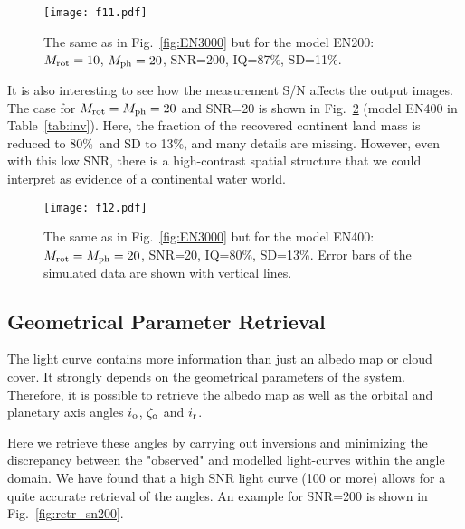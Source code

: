 \documentclass{emulateapj}
\begin{document}
\begin{figure}
\centering
\texttt{[image: f11.pdf]}
\caption{The same as in Fig.~\ref{fig:EN3000} but for the model EN200: 
$M_{\rm rot}=10$, $M_{\rm ph}=20$, SNR=200, IQ=87\%, SD=11\%.}
\label{fig:EN200}
\end{figure}

It is also interesting to see how the measurement S/N affects the output images.
The case for $M_{\rm rot}=M_{\rm ph}=20$ and SNR=20 is shown in Fig.~\ref{fig:EN400}
(model EN400 in Table~\ref{tab:inv}).
Here, the fraction of the recovered continent land mass 
is reduced to 80\%\ and SD to 13\%, and many details are missing.
However, even with this low SNR, there is a high-contrast spatial structure 
that we could interpret as evidence of a continental water world.

\begin{figure}
\centering
\texttt{[image: f12.pdf]}
\caption{The same as in Fig.~\ref{fig:EN3000} but for the model EN400: 
 $M_{\rm rot}=M_{\rm ph}=20$, SNR=20, IQ=80\%, SD=13\%.
Error bars of the simulated data are shown with vertical lines. }
\label{fig:EN400}
\end{figure}

\subsection{Geometrical Parameter Retrieval}\label{sec:retr}

The light curve contains more information than just an albedo map or cloud cover. 
It strongly depends on the geometrical parameters of the system. 
Therefore, it is possible to retrieve the albedo map as well as the orbital
and planetary axis angles  $i_{\rm o}$, $\zeta_{\rm o}$ and $i_{\rm r}$.

Here we retrieve these angles by carrying out inversions and minimizing the discrepancy 
between the "observed" and modelled light-curves within the angle domain. 
We have found that a high SNR light curve (100 or more) allows for a quite accurate 
retrieval of the angles. An example for SNR=200 is shown in Fig.~\ref{fig:retr_sn200}.
\end{document}
